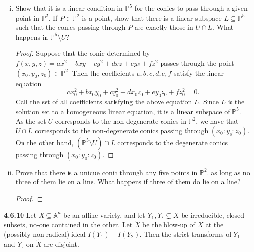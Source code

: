 \documentclass[11pt,letterpaper]{report}
\newcommand{\affine}{\mathbb{A}}
\newcommand{\proj}{\mathbb{P}}
\begin{document}
\begin{enumerate}[(i)]
\begin{proof}
		\noindent We have shown that our conic is non-degenerate if and only if the determinant of the matrix in (\ref{matrix}) is non-vanishing. The determinant is a polynomial in the in the coefficients $(a:b:c:d:e:f)\in \proj^5$, so the non-vanishing locus, and therefore the set of non-degenerate conics, corresponds to an open set in $\proj^5$.
	\end{proof}

	\item Show that it is a linear condition in $\proj^5$ for the conics to pass through a given point in $\proj^2$. If $P\in \proj^2$ is a point, show that there is a linear subspace $L\subseteq \proj^5$ such that the conics passing through $P$ are exactly those in $U\cap L$. What happens in $\proj^5\setminus U$?
	\begin{proof}
		Suppose that the conic determined by $f(x,y,z) = ax^2+bxy+cy^2 + dxz+eyz+fz^2$ passes through the point $(x_0, y_0, z_0)\in \proj^2$. Then the coefficients $a,b,c,d,e,f$ satisfy the linear equation
		\[
		ax_0^2+bx_0y_0+cy_0^2 + dx_0z_0+ey_0z_0+fz_0^2 = 0.
		\]
		Call the set of all coefficients satisfying the above equation $L$. Since $L$ is the solution set to a homogeneous linear equation, it is a linear subspace of $\proj^5$.
		As the set $U$ corresponds to the non-degenerate conics in $\proj^2$, we have that $U\cap L$ corresponds to the non-degenerate conics passing through $(x_0: y_0: z_0)$. On the other hand, $(\proj^5\setminus U)\cap L$ corresponds to the degenerate conics passing through $(x_0:y_0:z_0)$.
	\end{proof}

	\item Prove that there is a unique conic through any five points in $\proj^2$, as long as no three of them lie on a line. What happens if three of them do lie on a line?
	\begin{proof}
		
	\end{proof}
\end{enumerate}

\noindent\textbf{4.6.10}
Let $X\subseteq \affine^n$ be an affine variety, and let $Y_1, Y_2\subsetneq X$ be irreducible, closed subsets, no-one contained in the other. Let $\tilde{X}$ be the blow-up of $X$ at the (possibly non-radical) ideal $I(Y_1)+I(Y_2)$. Then the strict transforms of $Y_1$ and $Y_2$ on $\tilde{X}$ are disjoint.
\end{document}

